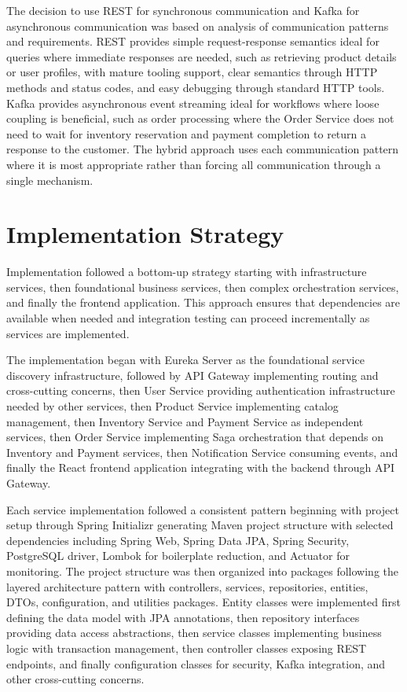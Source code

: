 The decision to use REST for synchronous communication and Kafka for asynchronous communication was based on analysis of communication patterns and requirements. REST provides simple request-response semantics ideal for queries where immediate responses are needed, such as retrieving product details or user profiles, with mature tooling support, clear semantics through HTTP methods and status codes, and easy debugging through standard HTTP tools. Kafka provides asynchronous event streaming ideal for workflows where loose coupling is beneficial, such as order processing where the Order Service does not need to wait for inventory reservation and payment completion to return a response to the customer. The hybrid approach uses each communication pattern where it is most appropriate rather than forcing all communication through a single mechanism.

\section{Implementation Strategy}

Implementation followed a bottom-up strategy starting with infrastructure services, then foundational business services, then complex orchestration services, and finally the frontend application. This approach ensures that dependencies are available when needed and integration testing can proceed incrementally as services are implemented.

The implementation began with Eureka Server as the foundational service discovery infrastructure, followed by API Gateway implementing routing and cross-cutting concerns, then User Service providing authentication infrastructure needed by other services, then Product Service implementing catalog management, then Inventory Service and Payment Service as independent services, then Order Service implementing Saga orchestration that depends on Inventory and Payment services, then Notification Service consuming events, and finally the React frontend application integrating with the backend through API Gateway.

Each service implementation followed a consistent pattern beginning with project setup through Spring Initializr generating Maven project structure with selected dependencies including Spring Web, Spring Data JPA, Spring Security, PostgreSQL driver, Lombok for boilerplate reduction, and Actuator for monitoring. The project structure was then organized into packages following the layered architecture pattern with controllers, services, repositories, entities, DTOs, configuration, and utilities packages. Entity classes were implemented first defining the data model with JPA annotations, then repository interfaces providing data access abstractions, then service classes implementing business logic with transaction management, then controller classes exposing REST endpoints, and finally configuration classes for security, Kafka integration, and other cross-cutting concerns.

